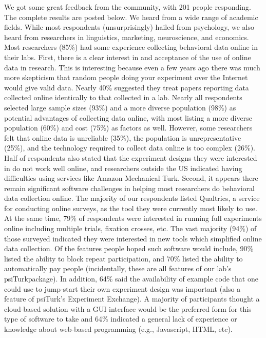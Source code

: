 \documentclass[jou,apacite]{apa6}
\begin{document}
We got some great feedback from the community, with 201 people responding.
The complete results are posted below.
We heard from a wide range of academic fields.
While most respondents (unsurprisingly) hailed from psychology, we also heard from researchers in linguistics, marketing, neuroscience, and economics.
Most researchers (85\%) had some experience collecting behavioral data online in their labs.
 First, there is a clear interest in and acceptance of the use of online data in research.
This is interesting because even a few years ago there was much more skepticism that random people doing your experiment over the Internet would give valid data.
Nearly 40\% suggested they treat papers reporting data collected online identically to that collected in a lab.
Nearly all respondents selected large sample sizes (93\%) and a more diverse population (98\%) as potential advantages of collecting data online, with most listing a more diverse population (60\%) and cost (75\%) as factors as well.
However, some researchers felt that online data is unreliable (35\%), the population is unrepresentative (25\%), and the technology required to collect data online is too complex (26\%).
Half of respondents also stated that the experiment designs they were interested in do not work well online, and researchers outside the US indicated having difficulties using services like Amazon Mechanical Turk.
Second, it appears there remain significant software challenges in helping most researchers do behavioral data collection online.
The majority of our respondents listed Qualtrics, a service for conducting online surveys, as the tool they were currently most likely to use.
At the same time, 79\% of respondents were interested in running full experiments online including multiple trials, fixation crosses, etc.
The vast majority (94\%) of those surveyed indicated they were interested in new tools which simplified online data collection.
Of the features people hoped such software would include, 90\% listed the ability to block repeat participation, and 70\% listed the ability to automatically pay people (incidentally, these are all features of our lab's psiTurkpackage).
In addition, 64\% said the availability of example code that one could use to jump-start their own experiment design was important (also a feature of psiTurk's Experiment Exchange).
A majority of participants thought a cloud-based solution with a GUI interface would be the preferred form for this type of software to take and 64\% indicated a general lack of experience or knowledge about web-based programming (e.g., Javascript, HTML, etc).
\end{document}
